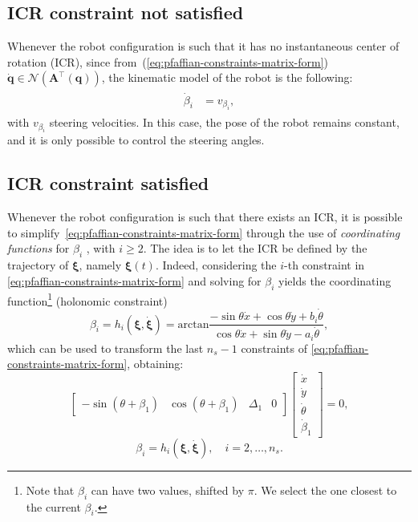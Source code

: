 \subsection{ICR constraint not satisfied}
Whenever the robot configuration is such that it has no instantaneous center
of rotation (ICR), since from~(\ref{eq:pfaffian-constraints-matrix-form})
$\dot{\bm{q}} \in \mathcal{N}(\bm{A}^\top(\bm{q}))$, the kinematic model of
the robot is the following:
\begin{align*}
\begin{split}
    \dot{\beta}_i &= v_{\beta_i},
\end{split}
\end{align*}
with $v_{\beta_i}$ steering velocities. In this case, the pose of the robot
remains constant, and it is only possible to control the steering angles. 

\subsection{ICR constraint satisfied}
\label{sec:icr-constraint-satisfied}
Whenever the robot configuration is such that there exists an ICR,
it is possible to simplify~\eqref{eq:pfaffian-constraints-matrix-form}
through the use of \textit{coordinating functions} for $\beta_i$
\cite{RobuffoGiordano2009ICRA}, with $i \ge 2$. The idea is to let the ICR
be defined by the trajectory of $\bm{\xi}$, namely $\bm{\xi} \left( t \right)$.
Indeed, considering the $i$-th constraint in
\eqref{eq:pfaffian-constraints-matrix-form} and solving for $\beta_i$ yields
the coordinating function\footnote{Note that $\beta_i$ can have two values,
shifted by $\pi$. We select the one closest to the current $\beta_i$.}
(holonomic constraint)
\begin{equation}
    \label{eq:coordinating-function-pre-kinematic-model}
    \beta_i = h_i(\bm{\xi}, \dot{\bm{\xi}}) = \mathrm{arctan} \frac{-\sin\theta\dot{x}+\cos\theta\dot{y}+b_i\dot{\theta}}{\cos\theta\dot{x}+\sin\theta\dot{y}-a_i\dot{\theta}},
\end{equation}
which can be used to transform the last $n_s-1$ constraints of
\eqref{eq:pfaffian-constraints-matrix-form}, obtaining:
\begin{equation}
    \label{eq:reduced-pfaffian-constraints-matrix-form}
    \begin{bmatrix}
        -\sin(\theta + \beta_1) &
        \cos(\theta + \beta_1) &
        \Delta_1 &
        0
    \end{bmatrix}
    \begin{bmatrix}
        \dot{x} \\ \dot{y} \\ \dot{\theta} \\ \dot{\beta}_1
    \end{bmatrix}
    = 0,
\end{equation}
\begin{equation*}
    \beta_i = h_i(\bm{\xi}, \dot{\bm{\xi}}), \quad i = 2, \dots, n_s.
\end{equation*}

